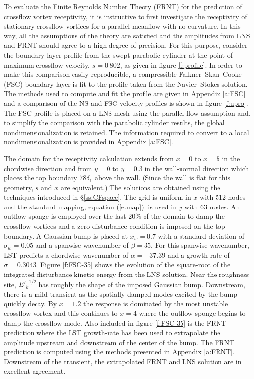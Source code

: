 To evaluate the Finite Reynolds Number Theory (FRNT) for the prediction of
crossflow vortex receptivity, it is instructive to first investigate the
receptivity of stationary crossflow vortices for a parallel meanflow with no
curvature.  In this way, all the assumptions of the theory are satisfied and
the amplitudes from LNS and FRNT should agree to a high degree of precision.
For this purpose, consider the boundary-layer profile from the swept
parabolic-cylinder at the point of maximum crossflow velocity, $s=0.802$, as
given in figure \ref{f:profile}.  In order to make this comparison easily
reproducible, a compressible Falkner--Skan--Cooke (FSC) boundary-layer is fit
to the profile taken from the Navier--Stokes solution.  The methods used to
compute and fit the profile are given in Appendix \ref{a:FSC} and a comparison
of the NS and FSC velocity profiles is shown in figure \ref{f:upro}.  The FSC
profile is placed on a LNS mesh using the parallel flow assumption and, to
simplify the comparison with the parabolic cylinder results, the global
nondimensionalization is retained.  The information required to convert to a
local nondimensionalization is provided in Appendix \ref{a:FSC}.

The domain for the receptivity calculation extends from $x = 0$ to $x = 5$ in
the chordwise direction and from $y=0$ to $y=0.3$ in the wall-normal direction
which places the top boundary $78 \delta_1$ above the wall.  (Since the wall
is flat for this geometry, $s$ and $x$ are equivalent.)  The solutions are
obtained using the techniques introduced in \S\ref{ss:CFspace}.  The grid is
uniform in $x$ with 512 nodes and the standard mapping, equation
(\ref{e:map}), is used in $y$ with 63 nodes.  An outflow sponge is employed
over the last $20\%$ of the domain to damp the crossflow vortices and a zero
disturbance condition is imposed on the top boundary.  A Gaussian bump is
placed at $x_w = 0.7$ with a standard deviation of $\sigma_w=0.05$ and a
spanwise wavenumber of $\beta=35$.  For this spanwise wavenumber, LST predicts
a chordwise wavenumber of $\alpha = -37.39$ and a growth-rate of $\sigma =
0.3043$.  Figure \ref{f:FSC-35} shows the evolution of the square-root of the
integrated disturbance kinetic energy from the LNS solution.  Near the
roughness site, ${E'_k}^{1/2}$ has roughly the shape of the imposed Gaussian
bump.  Downstream, there is a mild transient as the spatially damped modes
excited by the bump quickly decay.  By $x=1.2$ the response is dominated by
the most unstable crossflow vortex and this continues to $x=4$ where the
outflow sponge begins to damp the crossflow mode.  Also included in figure
\ref{f:FSC-35} is the FRNT prediction where the LST growth-rate has been used
to extrapolate the amplitude upstream and downstream of the center of the
bump.  The FRNT prediction is computed using the methods presented in Appendix
\ref{a:FRNT}.  Downstream of the transient, the extrapolated FRNT and LNS
solution are in excellent agreement.

